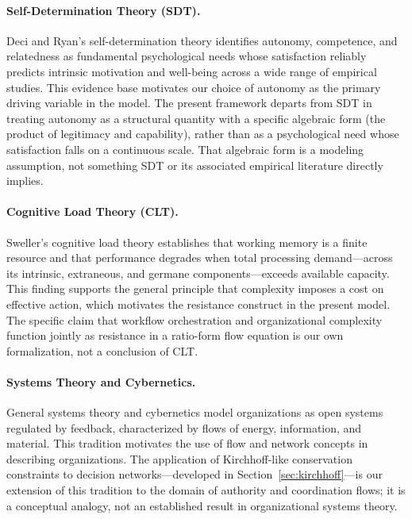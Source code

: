 \documentclass[12pt]{article}
\begin{document}
\paragraph{Self-Determination Theory (SDT).}
Deci and Ryan's self-determination theory \citep{deci2000self, ryan2000self}
identifies autonomy, competence, and relatedness as fundamental psychological
needs whose satisfaction reliably predicts intrinsic motivation and well-being
across a wide range of empirical studies. This evidence base motivates our
choice of autonomy as the primary driving variable in the model. The present
framework departs from SDT in treating autonomy as a structural quantity with
a specific algebraic form (the product of legitimacy and capability), rather
than as a psychological need whose satisfaction falls on a continuous scale.
That algebraic form is a modeling assumption, not something SDT or its
associated empirical literature directly implies.

\paragraph{Cognitive Load Theory (CLT).}
Sweller's cognitive load theory \citep{sweller1988cognitive,
sweller1994cognitive} establishes that working memory is a finite resource and
that performance degrades when total processing demand---across its intrinsic,
extraneous, and germane components---exceeds available capacity. This finding
supports the general principle that complexity imposes a cost on effective
action, which motivates the resistance construct in the present model. The
specific claim that workflow orchestration and organizational complexity
function jointly as resistance in a ratio-form flow equation is our own
formalization, not a conclusion of CLT.

\paragraph{Systems Theory and Cybernetics.}
General systems theory \citep{bertalanffy1968general} and cybernetics
\citep{ashby1956introduction, wiener1948cybernetics} model organizations as
open systems regulated by feedback, characterized by flows of energy,
information, and material. This tradition motivates the use of flow and
network concepts in describing organizations. The application of
Kirchhoff-like conservation constraints to decision networks---developed in
Section~\ref{sec:kirchhoff}---is our extension of this tradition to the domain
of authority and coordination flows; it is a conceptual analogy, not an
established result in organizational systems theory.
\end{document}
